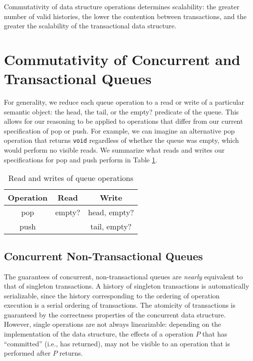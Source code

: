 \begin{corollary}
    Commutativity of data structure operations determines scalability: the greater number of valid histories, the lower the contention between transactions, and the greater the scalability of the transactional data structure. 
\end{corollary}


\section{Commutativity of Concurrent and Transactional Queues}

For generality, we reduce each queue operation to a read or write of a particular semantic object: the head, the tail, or the empty? predicate of the queue. This allows for our reasoning to be applied to operations that differ from our current specification of pop or push. For example, we can imagine an alternative pop operation that returns \texttt{void} regardless of whether the queue was empty, which would perform no visible reads. We summarize what reads and writes our specifications for pop and push perform in Table \ref{table:qrw}.

\begin{table}[t]
\centering
\begin{tabular}{c||c|c}
    Operation & Read & Write\\
    \hline
    \hline
    pop & empty? & head, empty?\\
    push & & tail, empty?\\
\end{tabular}
    \caption{Read and writes of queue operations}
    \label{table:qrw}
\end{table}

\subsection{Concurrent Non-Transactional Queues}

The guarantees of concurrent, non-transactional queues are \emph{nearly} equivalent to that of singleton transactions. A history of singleton transactions is automatically serializable, since the history corresponding to the ordering of operation execution is a serial ordering of transactions. The atomicity of transactions is guaranteed by the correctness properties of the concurrent data structure. However, single operations are not always linearizable: depending on the implementation of the data structure, the effects of a operation $P$ that has ``committed'' (i.e., has returned), may not be visible to an operation that is performed after $P$ returns.

